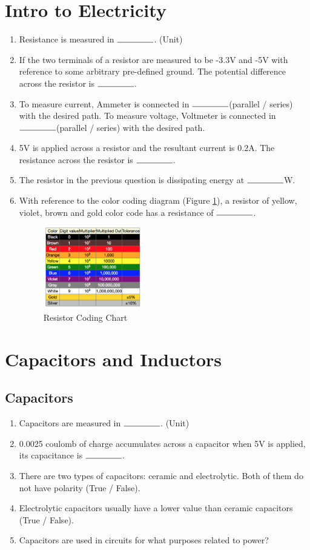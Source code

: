 \documentclass{article}
\newcommand{\ans}{$\rule{1.5cm}{0.15mm}$}
\begin{document}
\section{Intro to Electricity}
\begin{enumerate}
	\item Resistance is measured in \ans. (Unit)
	\item If the two terminals of a resistor are measured to be -3.3V and -5V with reference to some arbitrary pre-defined ground. The potential difference across the resistor is \ans.
	\item To measure current, Ammeter is connected in \ans (parallel / series) with the desired path. To measure voltage, Voltmeter is connected in \ans (parallel / series) with the desired path.
	\item 5V is applied across a resistor and the resultant current is 0.2A. The resistance across the resistor is \ans.
	\item The resistor in the previous question is dissipating energy at \ans W.
	\item With reference to the color coding diagram (Figure \ref{fig:Resistor}), a resistor of yellow, violet, brown and gold color code has a resistance of \ans.
	\begin{figure}
		\center
		\includegraphics[width=0.4\textwidth, keepaspectratio]{rcolorcoding}
		\caption{Resistor Coding Chart}
		\label{fig:Resistor}
	\end{figure}
\end{enumerate}

\section{Capacitors and Inductors}
\subsection{Capacitors}
\begin{enumerate}
	\item Capacitors are measured in \ans. (Unit)
	\item 0.0025 coulomb of charge accumulates across a capacitor when 5V is applied, its capacitance is \ans.
	\item There are two types of capacitors: ceramic and electrolytic. Both of them do not have polarity (True / False).
	\item Electrolytic capacitors usually have a lower value than ceramic capacitors (True / False).
	\item Capacitors are used in circuits for what purposes related to power?
\end{enumerate}
\end{document}
